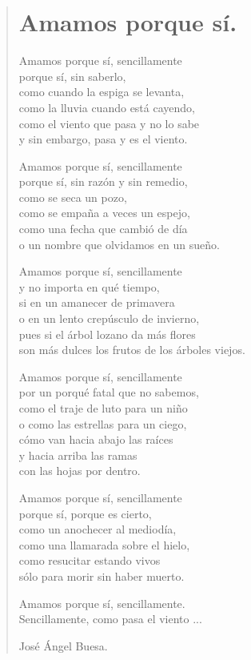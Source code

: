 \documentclass[11pt, portrait, twoside, notitlepage, openright]{book}
\begin{document}
\newpage
\begin{verse}
\begin{center}
\section{Amamos porque sí.}
\end{center}
Amamos porque sí, sencillamente\\
porque sí, sin saberlo,\\
como cuando la espiga se levanta,\\
como la lluvia cuando está cayendo,\\
como el viento que pasa y no lo sabe\\
y sin embargo, pasa y es el viento.
\newline

Amamos porque sí, sencillamente\\
porque sí, sin razón y sin remedio,\\
como se seca un pozo,\\
como se empaña a veces un espejo,\\
como una fecha que cambió de día\\
o un nombre que olvidamos en un sueño.
\newline

Amamos porque sí, sencillamente\\
y no importa en qué tiempo,\\
si en un amanecer de primavera\\
o en un lento crepúsculo de invierno,\\
pues si el árbol lozano da más flores\\
son más dulces los frutos de los árboles viejos.
\newpage

Amamos porque sí, sencillamente\\
por un porqué fatal que no sabemos,\\
como el traje de luto para un niño\\
o como las estrellas para un ciego,\\
cómo van hacia abajo las raíces\\
y hacia arriba las ramas\\
con las hojas por dentro.
\newline

Amamos porque sí, sencillamente\\
porque sí, porque es cierto,\\
como un anochecer al mediodía,\\
como una llamarada sobre el hielo,\\
como resucitar estando vivos\\
sólo para morir sin haber muerto.
\newline

Amamos porque sí, sencillamente.\\
Sencillamente, como pasa el viento ...
\newline

José Ángel Buesa.
\end{verse}
\end{document}
